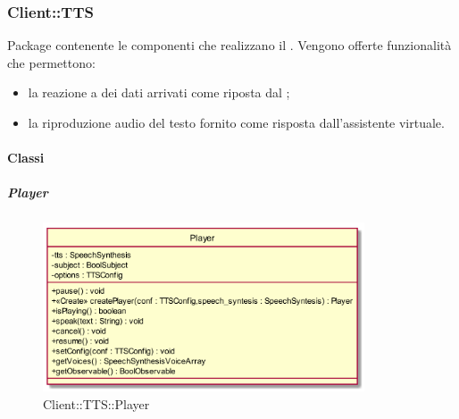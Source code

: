\subsubsection{Client::TTS}
Package contenente le componenti che realizzano il .
Vengono offerte funzionalità che permettono:
\begin{itemize}
	\item la reazione a dei dati arrivati come riposta dal ;
	\item la riproduzione audio del testo fornito come risposta dall'assistente virtuale.
\end{itemize}

\paragraph{Classi}
\hypertarget{Player_label}{\subparagraph{Player}}
\begin{figure}[h]
	\centering
	\includegraphics[width=0.85\textwidth,height=\textheight,keepaspectratio]{images/ClassPlayer.png}
	\caption{Client::TTS::Player}
\end{figure}
